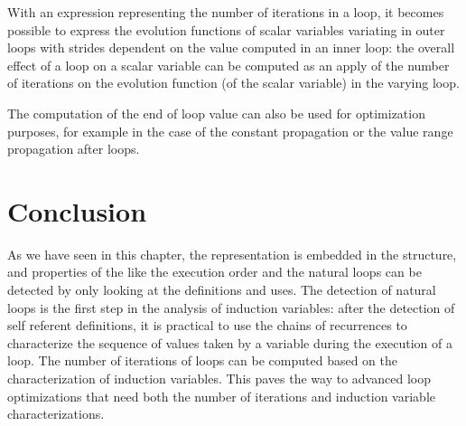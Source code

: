 With an expression representing the number of iterations in a loop, it
becomes possible to express the evolution functions of scalar
variables variating in outer loops with strides dependent on the value
computed in an inner loop: the overall effect of a loop on a scalar
variable can be computed as an apply of the number of iterations on
the evolution function (of the scalar variable) in the varying loop.

The computation of the end of loop value can also be used for
optimization purposes, for example in the case of the constant
propagation or the value range propagation after loops.

\section{Conclusion}

As we have seen in this chapter, the \CFG{} representation is embedded
in the \SSA{} structure, and properties of the \CFG{} like the
execution order and the natural loops can be detected by only looking
at the \SSA{} definitions and uses.  The detection of natural loops is
the first step in the analysis of induction variables: after the
detection of self referent definitions, it is practical to use the
chains of recurrences to characterize the sequence of values taken by
a variable during the execution of a loop.  The number of iterations
of loops can be computed based on the characterization of induction
variables.  This paves the way to advanced loop optimizations that
need both the number of iterations and induction variable
characterizations.
